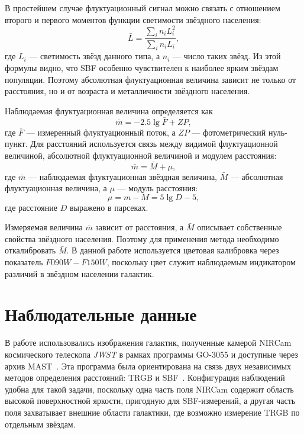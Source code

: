 \documentclass[12pt,a4paper]{article}
\begin{document}
В простейшем случае флуктуационный сигнал можно связать с отношением второго и первого моментов функции светимости звёздного населения:
\begin{equation}
    \bar{L} = \frac{\sum_i n_i L_i^2}{\sum_i n_i L_i},
\end{equation}
где $L_i$ --- светимость звёзд данного типа, а $n_i$ --- число таких звёзд. Из этой формулы видно, что SBF особенно чувствителен к наиболее ярким звёздам популяции. Поэтому абсолютная флуктуационная величина зависит не только от расстояния, но и от возраста и металличности звёздного населения.

Наблюдаемая флуктуационная величина определяется как
\begin{equation}
    \bar{m} = -2.5\lg \bar{F} + ZP,
\end{equation}
где $\bar{F}$ --- измеренный флуктуационный поток, а $ZP$ --- фотометрический нуль-пункт. Для расстояний используется связь между видимой флуктуационной величиной, абсолютной флуктуационной величиной и модулем расстояния:
\begin{equation}
    \bar{m} = \bar{M} + \mu,
\end{equation}
где $\bar{m}$ --- наблюдаемая флуктуационная звёздная величина, $\bar{M}$ --- абсолютная флуктуационная величина, а $\mu$ --- модуль расстояния:
\begin{equation}
    \mu = m - M = 5\lg D - 5,
\end{equation}
где расстояние $D$ выражено в парсеках.

Измеряемая величина $\bar{m}$ зависит от расстояния, а $\bar{M}$ описывает собственные свойства звёздного населения. Поэтому для применения метода необходимо откалибровать $\bar{M}$. В данной работе используется цветовая калибровка через показатель $F090W-F150W$, поскольку цвет служит наблюдаемым индикатором различий в звёздном населении галактик.

\section{Наблюдательные данные}

В работе использовались изображения галактик, полученные камерой NIRCam космического телескопа \textit{JWST} в рамках программы GO-3055 и доступные через архив MAST~\cite{MAST}. Эта программа была ориентирована на связь двух независимых методов определения расстояний: TRGB и SBF~\cite{Anand2024,Jensen2025,Chazov2026}. Конфигурация наблюдений удобна для такой задачи, поскольку одна часть поля NIRCam содержит область высокой поверхностной яркости, пригодную для SBF-измерений, а другая часть поля захватывает внешние области галактики, где возможно измерение TRGB по отдельным звёздам.
\end{document}
